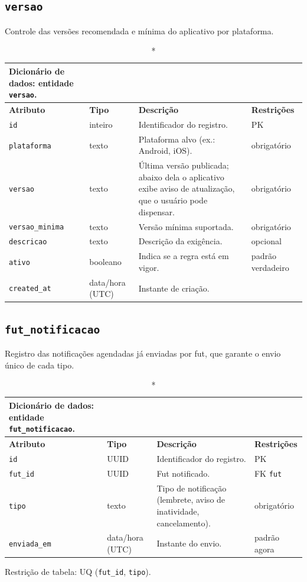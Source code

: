 \begin{apendicesenv}
    \subsection*{\texttt{versao}}
    Controle das versões recomendada e mínima do aplicativo por plataforma.
    \begin{longtable}{p{2.5cm}p{2.1cm}p{5.8cm}p{2.9cm}}
    \caption*{Dicionário de dados: entidade \texttt{versao}.}\\
        \hline
        \textbf{Atributo} & \textbf{Tipo} & \textbf{Descrição} & \textbf{Restrições} \\
        \hline
        \endhead
        \texttt{id} & inteiro & Identificador do registro. & PK \\
        \texttt{plataforma} & texto & Plataforma alvo (ex.: Android, iOS). & obrigatório \\
        \texttt{versao} & texto & Última versão publicada; abaixo dela o aplicativo exibe aviso de atualização, que o usuário pode dispensar. & obrigatório \\
        \texttt{versao\_minima} & texto & Versão mínima suportada. & obrigatório \\
        \texttt{descricao} & texto & Descrição da exigência. & opcional \\
        \texttt{ativo} & booleano & Indica se a regra está em vigor. & padrão verdadeiro \\
        \texttt{created\_at} & data/hora (UTC) & Instante de criação. & \\
        \hline
    \end{longtable}

    \subsection*{\texttt{fut\_notificacao}}
    Registro das notificações agendadas já enviadas por fut, que garante o envio único de cada tipo.
    \begin{longtable}{p{2.5cm}p{2.1cm}p{5.8cm}p{2.9cm}}
    \caption*{Dicionário de dados: entidade \texttt{fut\_notificacao}.}\\
        \hline
        \textbf{Atributo} & \textbf{Tipo} & \textbf{Descrição} & \textbf{Restrições} \\
        \hline
        \endhead
        \texttt{id} & UUID & Identificador do registro. & PK \\
        \texttt{fut\_id} & UUID & Fut notificado. & FK \texttt{fut} \\
        \texttt{tipo} & texto & Tipo de notificação (lembrete, aviso de inatividade, cancelamento). & obrigatório \\
        \texttt{enviada\_em} & data/hora (UTC) & Instante do envio. & padrão agora \\
        \hline
    \end{longtable}
    \noindent Restrição de tabela: UQ (\texttt{fut\_id}, \texttt{tipo}).


\end{apendicesenv}

